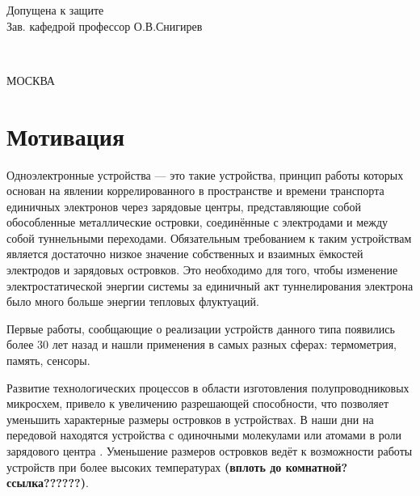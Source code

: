 \documentclass[12pt,a4paper]{report}
\renewcommand{\small}{\fontsize{12}{14.5pt}\selectfont}
\renewcommand{\normalsize}{\fontsize{14}{18pt}\selectfont}
\begin{document}
\begin{titlepage}
\begin{flushright}
\end{flushright}

\vspace{1cm}
\begin{flushleft}
Допущена к защите \\
Зав. кафедрой профессор О.В.Снигирев

\underline{\hspace{3cm}} \\
\end{flushleft}
\begin{center}
\vspace{1cm}
\small МОСКВА \\ \number\year\normalsize
\end{center}
\end{titlepage}



\setcounter{page}{2}
\tableofcontents

\chapter*{Мотивация}

Одноэлектронные устройства — это такие устройства, принцип работы которых основан на явлении коррелированного в пространстве и времени транспорта единичных электронов через зарядовые центры, представляющие собой обособленные металлические островки, соединённые с электродами и между собой туннельными переходами. Обязательным требованием к таким устройствам является достаточно низкое значение собственных и взаимных ёмкостей электродов и зарядовых островков. Это необходимо для того, чтобы изменение электростатической энергии системы за единичный акт туннелирования электрона было много больше энергии тепловых флуктуаций.

Первые работы, сообщающие о реализации устройств данного типа появились более 30 лет назад \cite{Fulton_Dolan, Amman, Likharev} и нашли применения в самых разных сферах:  термометрия\cite{Thermo}, память\cite{memory}, сенсоры\cite{sensor}.

Развитие технологических процессов в области изготовления полупроводниковых микросхем, привело к увеличению разрешающей способности, что позволяет уменьшить характерные размеры островков в устройствах. В наши дни на передовой находятся устройства с одиночными молекулами или атомами в роли зарядового центра \cite{SASET_EXP_OUR, SMSET}. Уменьшение размеров островков ведёт к возможности работы устройств при более высоких температурах \textbf{(вплоть до комнатной? ссылка??????)}. 
\end{document}
